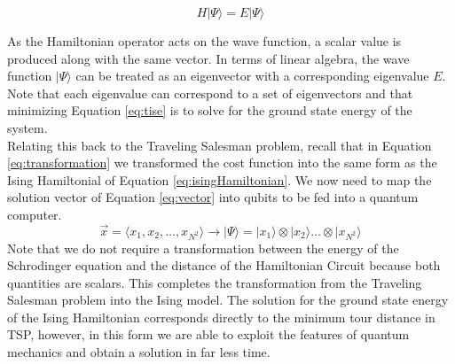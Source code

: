 		\begin{equation}
			H | \Psi \rangle = E | \Psi \rangle
			\label{eq:tise}
		\end{equation}
	
		As the Hamiltonian operator acts on the wave function, a scalar value is produced along with the same vector. 
		In terms of linear algebra, the wave function $| \Psi \rangle$ can be treated as an eigenvector with a corresponding eigenvalue $E$. 
		Note that each eigenvalue can correspond to a set of eigenvectors and that minimizing Equation \ref{eq:tise} is to solve for the ground state energy of the system. \\
		
		Relating this back to the Traveling Salesman problem, recall that in Equation \ref{eq:transformation} we transformed the cost function into the same form as the Ising Hamiltonial of Equation \ref{eq:isingHamiltonian}. We now need to map the solution vector of Equation \ref{eq:vector} into qubits to be fed into a quantum computer. 
		\begin{equation}
			\vec{x} = \langle x_1, x_2, \dots, x_{N^2} \rangle \rightarrow |\Psi\rangle = |x_1\rangle \otimes |x_2\rangle \dots \otimes  |x_{N^2}\rangle 
		\end{equation}
		Note that we do not require a transformation between the energy of the Schrodinger equation and the distance of the Hamiltonian Circuit because both quantities are scalars. This completes the transformation from the Traveling Salesman problem into the Ising model. The solution for the ground state energy of the Ising Hamiltonian corresponds directly to the minimum tour distance in TSP, however, in this form we are able to exploit the features of quantum mechanics and obtain a solution in far less time. 

